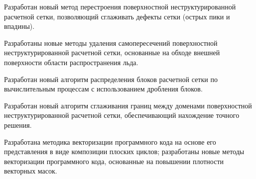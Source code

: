 \item Разработан новый метод перестроения поверхностной неструктурированной расчетной сетки, позволяющий сглаживать дефекты сетки (острых пики и впадины).
\item Разработаны новые методы удаления самопересечений поверхностной неструктурированной расчетной сетки, основанные на обходе внешней поверхности области распространения льда.
\item Разработан новый алгоритм распределения блоков расчетной сетки по вычислительным процессам с использованием дробления блоков.
\item Разработан новый алгоритм сглаживания границ между доменами поверхностной неструктурированной расчетной сетки, обеспечивающий нахождение точного решения.
\item Разработана методика векторизации программного кода на основе его представления в виде композиции плоских циклов; разработаны новые методы векторизации программного кода, основанные на повышении плотности векторных масок.